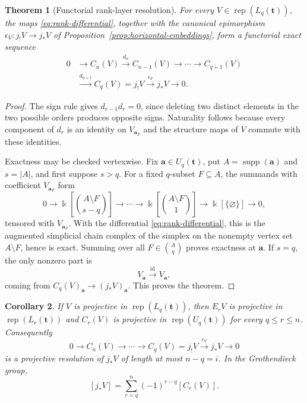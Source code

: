 \documentclass[10pt,a4paper]{amsart}
\newtheorem{theorem}{Theorem}[section]
\newtheorem{corollary}[theorem]{Corollary}
\newcommand{\Rep}{\operatorname{rep}}
\begin{document}
\begin{theorem}[Functorial rank-layer resolution]\label{thm:rank-layer-resolution}
For every $V\in\Rep(L_q(\mathbf t))$, the maps \eqref{eq:rank-differential}, together with the canonical epimorphism
$\epsilon_V:j_!V\to j_*V$ of Proposition~\ref{prop:horizontal-embeddings}, form a functorial exact sequence
\begin{equation}\label{eq:rank-layer-resolution}
\boxed{
\begin{aligned}
0&\longrightarrow C_n(V)\xrightarrow{d_n}C_{n-1}(V)
\longrightarrow\cdots\longrightarrow C_{q+1}(V)\\
&\xrightarrow{d_{q+1}}C_q(V)=j_!V
\xrightarrow{\epsilon_V}j_*V\longrightarrow0.
\end{aligned}}
\end{equation}
\end{theorem}

\begin{proof}
The sign rule gives $d_{r-1}d_r=0$, since deleting two distinct elements in the two possible orders produces opposite signs.  Naturality follows because every component of $d_r$ is an identity on $V_{\mathbf a_F}$ and the structure maps of $V$ commute with these identities.

Exactness may be checked vertexwise.  Fix $\mathbf a\in U_q(\mathbf t)$, put $A=\operatorname{supp}(\mathbf a)$ and $s=|A|$, and first suppose $s>q$.  For a fixed $q$-subset $F\subseteq A$, the summands with coefficient $V_{\mathbf a_F}$ form
\[
0\longrightarrow
\Bbbk\!\left[\binom{A\setminus F}{s-q}\right]\longrightarrow\cdots\longrightarrow
\Bbbk\!\left[\binom{A\setminus F}{1}\right]\longrightarrow
\Bbbk\!\left[\{\varnothing\}\right]\longrightarrow0,
\]
tensored with $V_{\mathbf a_F}$.  With the differential \eqref{eq:rank-differential}, this is the augmented simplicial chain complex of the simplex on the nonempty vertex set $A\setminus F$, hence is exact.  Summing over all $F\in\binom{A}{q}$ proves exactness at $\mathbf a$.  If $s=q$, the only nonzero part is
\[
V_{\mathbf a}\xrightarrow{\mathrm{id}}V_{\mathbf a},
\]
coming from $C_q(V)_{\mathbf a}\to(j_*V)_{\mathbf a}$.  This proves the theorem.
\end{proof}

\begin{corollary}\label{cor:projective-rank-resolution}
If $V$ is projective in $\Rep(L_q(\mathbf t))$, then $E_rV$ is projective in
$\Rep(L_r(\mathbf t))$ and $C_r(V)$ is projective in
$\Rep(U_q(\mathbf t))$ for every $q\le r\le n$.  Consequently
\[
0\longrightarrow C_n(V)\longrightarrow\cdots\longrightarrow C_q(V)=j_!V
\xrightarrow{\epsilon_V}j_*V\longrightarrow0
\]
is a projective resolution of $j_*V$ of length at most $n-q=i$.  In the
Grothendieck group,
\[
[j_*V]=\sum_{r=q}^{n}(-1)^{r-q}[C_r(V)].
\]
\end{corollary}
\end{document}
